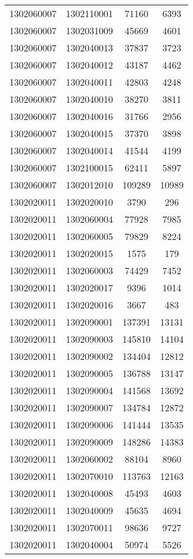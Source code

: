 \begin{longtable}[h]{llcc}
		1302060007 & 1302110001 & 71160 & 6393\\
		1302060007 & 1302031009 & 45669 & 4601\\
		1302060007 & 1302040013 & 37837 & 3723\\
		1302060007 & 1302040012 & 43187 & 4462\\
		1302060007 & 1302040011 & 42803 & 4248\\
		1302060007 & 1302040010 & 38270 & 3811\\
		1302060007 & 1302040016 & 31766 & 2956\\
		1302060007 & 1302040015 & 37370 & 3898\\
		1302060007 & 1302040014 & 41544 & 4199\\
		1302060007 & 1302100015 & 62411 & 5897\\
		1302060007 & 1302012010 & 109289 & 10989\\
		1302020011 & 1302020010 & 3790 & 296\\
		1302020011 & 1302060004 & 77928 & 7985\\
		1302020011 & 1302060005 & 79829 & 8224\\
		1302020011 & 1302020015 & 1575 & 179\\
		1302020011 & 1302060003 & 74429 & 7452\\
		1302020011 & 1302020017 & 9396 & 1014\\
		1302020011 & 1302020016 & 3667 & 483\\
		1302020011 & 1302090001 & 137391 & 13131\\
		1302020011 & 1302090003 & 145810 & 14104\\
		1302020011 & 1302090002 & 134404 & 12812\\
		1302020011 & 1302090005 & 136788 & 13147\\
		1302020011 & 1302090004 & 141568 & 13692\\
		1302020011 & 1302090007 & 134784 & 12872\\
		1302020011 & 1302090006 & 141444 & 13535\\
		1302020011 & 1302090009 & 148286 & 14383\\
		1302020011 & 1302060002 & 88104 & 8960\\
		1302020011 & 1302070010 & 113763 & 12163\\
		1302020011 & 1302040008 & 45493 & 4603\\
		1302020011 & 1302040009 & 45635 & 4694\\
		1302020011 & 1302070011 & 98636 & 9727\\
		1302020011 & 1302040004 & 50974 & 5526\\

\end{longtable}
